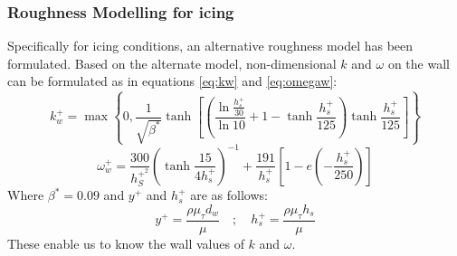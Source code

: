 \documentclass[11pt,a4paper,twoside,oneside]{article}
\begin{document}
\subsubsection{Roughness Modelling for icing}\label{sec:roughness}
Specifically for icing conditions, an alternative roughness model has been formulated\cite{icesst}. Based on the alternate model, non-dimensional $k$ and $\omega$ on the wall can be formulated as in equations \ref{eq:kw} and \ref{eq:omegaw}:
\begin{equation}
\label{eq:kw}k_{w}^{+}=\max \left\{0, \frac{1}{\sqrt{\beta^{*}}} \tanh \left[\left(\frac{\ln \frac{h_{s}^{+}}{30}}{\ln 10}+1-\tanh \frac{h_{s}^{+}}{125}\right) \tanh \frac{h_{s}^{+}}{125}\right]\right\} 
\end{equation}
\begin{equation}\label{eq:omegaw}
 \omega_{w}^{+}=\frac{300}{h_{S}^{+^2}}\left(\tanh \frac{15}{4 h_{s}^{+}}\right)^{-1}+\frac{191}{h_{s}^{+}}\left[1-e\left(-\frac{h_{s}^{+}}{250}\right)\right]
\end{equation}
Where $\beta^*=0.09$ and $y^+$ and $h^+_s$ are as follows:
$$y^+=\frac{\rho\mu_\tau d_w}{\mu}\quad ; \quad h^+_s=\frac{\rho\mu_\tau h_s}{\mu}$$
These enable us to know the wall values of $k$ and $\omega$\cite{icesst}.
\end{document}
